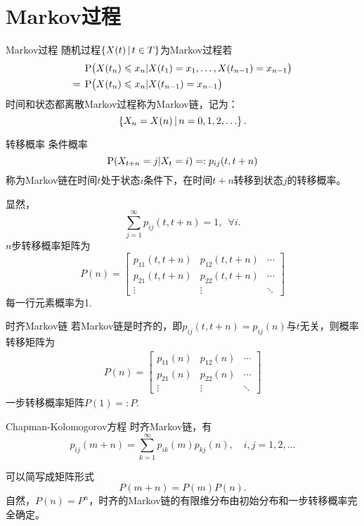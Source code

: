 \section{Markov过程}
\begin{definition}{Markov过程}{}
	随机过程$\set{X(t)}{t\in T}$为Markov过程若%
	\begin{align*}
		&\P\bigkh{X(t_n)\leqslant x_n|X(t_1)=x_1,\ldots,X(t_{n-1})=x_{n-1}}\\
		={}&\P\bigkh{X(t_n)\leqslant x_n|X(t_{n-1})=x_{n-1}}
	\end{align*}
	时间和状态都离散Markov过程称为Markov链，记为：
	\[
		\set{X_n=X(n)}{n=0,1,2,\ldots}.
	\]
\end{definition}
\begin{definition}{转移概率}{}
	条件概率 
	\[
		\P(X_{t+n}=j|X_t=i)=:p_{ij}(t,t+n)
	\]
	称为Markov链在时间$t$处于状态$i$条件下，在时间$t+n$转移到状态$j$的转移概率。
\end{definition}
显然，
\[
	\sum_{j=1}^\infty p_{ij}(t,t+n)=1,\enspace\forall i.
\]
$n$步转移概率矩阵为
\begin{equation}
	P(n)=\begin{bmatrix}
		p_{11}(t,t+n)&p_{12}(t,t+n)&\cdots\\
		p_{21}(t,t+n)&p_{22}(t,t+n)&\cdots\\
		\vdots&\vdots&\ddots
	\end{bmatrix}
\end{equation}
每一行元素概率为1.
\begin{definition}{时齐Markov链}{}
	若Markov链是时齐的，即$p_{ij}(t,t+n)=p_{ij}(n)$与$t$无关，则概率转移矩阵为
	\begin{align*}
		P(n)=\begin{bmatrix}
			p_{11}(n)&p_{12}(n)&\cdots\\
			p_{21}(n)&p_{22}(n)&\cdots\\
			\vdots&\vdots&\ddots
		\end{bmatrix}
	\end{align*}
	一步转移概率矩阵$P(1)=:P.$
\end{definition}
\begin{theorem}{Chapman-Kolomogorov方程}{}
	时齐Markov链，有
	\begin{equation*}
		p_{ij}(m+n)=\sum_{k=1}^\infty p_{ik}(m)p_{kj}(n),\quad i,j=1,2,\ldots
	\end{equation*}
\end{theorem}
可以简写成矩阵形式
\[
	P(m+n)=P(m)P(n).
\]
自然，$P(n)=P^n$，时齐的Markov链的有限维分布由初始分布和一步转移概率完全确定。
